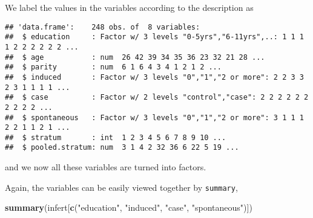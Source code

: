 \documentclass[]{book}
\newenvironment{Shaded}{\begin{snugshade}}{\end{snugshade}}
\newcommand{\KeywordTok}[1]{\textcolor[rgb]{0.13,0.29,0.53}{\textbf{{#1}}}}
\newcommand{\DataTypeTok}[1]{\textcolor[rgb]{0.13,0.29,0.53}{{#1}}}
\newcommand{\DecValTok}[1]{\textcolor[rgb]{0.00,0.00,0.81}{{#1}}}
\newcommand{\StringTok}[1]{\textcolor[rgb]{0.31,0.60,0.02}{{#1}}}
\newcommand{\NormalTok}[1]{{#1}}
\theoremstyle{definition}
\theoremstyle{definition}
\theoremstyle{remark}
\begin{document}
We label the values in the variables according to the description as

\begin{Shaded}
\end{Shaded}

\begin{verbatim}
## 'data.frame':    248 obs. of  8 variables:
##  $ education     : Factor w/ 3 levels "0-5yrs","6-11yrs",..: 1 1 1 1 2 2 2 2 2 2 ...
##  $ age           : num  26 42 39 34 35 36 23 32 21 28 ...
##  $ parity        : num  6 1 6 4 3 4 1 2 1 2 ...
##  $ induced       : Factor w/ 3 levels "0","1","2 or more": 2 2 3 3 2 3 1 1 1 1 ...
##  $ case          : Factor w/ 2 levels "control","case": 2 2 2 2 2 2 2 2 2 2 ...
##  $ spontaneous   : Factor w/ 3 levels "0","1","2 or more": 3 1 1 1 2 2 1 1 2 1 ...
##  $ stratum       : int  1 2 3 4 5 6 7 8 9 10 ...
##  $ pooled.stratum: num  3 1 4 2 32 36 6 22 5 19 ...
\end{verbatim}

and we now all these variables are turned into factors.

Again, the variables can be easily viewed together by \texttt{summary},

\begin{Shaded}
\begin{Highlighting}[]
\KeywordTok{summary}\NormalTok{(infert[}\KeywordTok{c}\NormalTok{(}\StringTok{"education"}\NormalTok{, }\StringTok{"induced"}\NormalTok{, }\StringTok{"case"}\NormalTok{, }\StringTok{"spontaneous"}\NormalTok{)])}
\end{Highlighting}
\end{Shaded}
\end{document}
